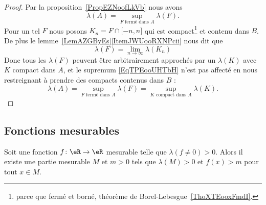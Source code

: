 \begin{proof}
    Par la proposition~\ref{PropEZNoofLkVb} nous avons
    \begin{equation}    \label{EqTPEooUHTbH}
        \lambda(A)=\sup_{ F\text{ fermé dans } A}\lambda(F).
    \end{equation}
    Pour un tel \( F\) nous posons \( K_n=F\cap\mathopen[ -n , n \mathclose]\) qui est compact\footnote{parce que fermé et borné, théorème de Borel-Lebesgue~\ref{ThoXTEooxFmdI}.} et contenu dans \( B\). De plus le lemme~\ref{LemAZGByEs}\ref{ItemJWUooRXNPcii} nous dit que
    \begin{equation}
        \lambda(F)=\lim_{n\to \infty} \lambda(K_n)
    \end{equation}
    Donc tous les \( \lambda(F)\) peuvent être arbitrairement approchés par un \( \lambda(K)\) avec \( K\) compact dans \( A\), et le supremum \eqref{EqTPEooUHTbH} n'est pas affecté en nous restreignant à prendre des compacts contenus dans \( B\) :
    \begin{equation}
        \lambda(A)=\sup_{ F\text{ fermé dans } A}\lambda(F)=\sup_{ K\text{ compact dans } A}\lambda(K).
    \end{equation}
\end{proof}

\subsection{Fonctions mesurables}

\begin{lemma}
    Soit une fonction \( f\colon \eR\to \eR\) mesurable telle que \( \lambda(f\neq 0)>0\). Alors il existe une partie mesurable \( M\) et \( m>0\) tels que \( \lambda(M)>0\) et \( f(x)>m\) pour tout \( x\in M\).
\end{lemma}

